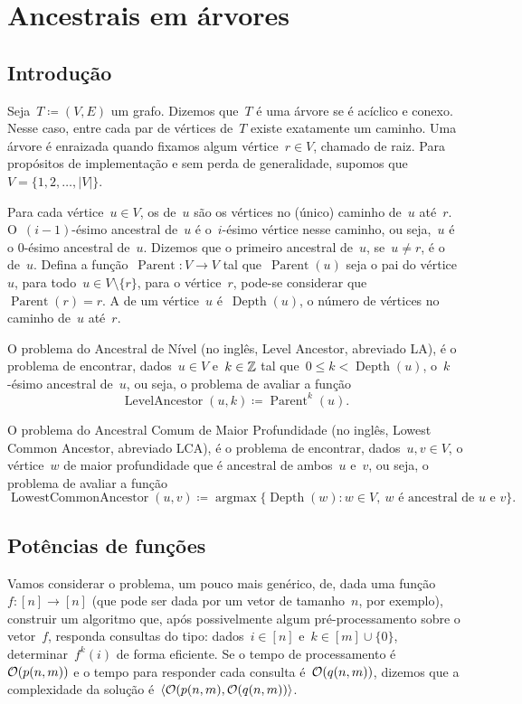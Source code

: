 \documentclass[main.tex]{subfiles}
\newcommand{\Par}{\operatorname{Parent}}
\newcommand{\LA}{\operatorname{LevelAncestor}}
\newcommand{\Dep}{\operatorname{Depth}}
\newcommand{\LCA}{\operatorname{LowestCommonAncestor}}
\newcommand{\argmax}{\operatorname{argmax}}
\begin{document}
\chapter{Ancestrais em árvores} \label{cap:ancestrais}

\section{Introdução}

Seja~$T \coloneqq (V, E)$ um grafo. Dizemos que~$T$ é uma árvore se é acíclico e conexo. Nesse caso, entre cada par de vértices de~$T$ existe exatamente um caminho. Uma árvore é enraizada quando fixamos algum vértice~${r \in V}$, chamado de raiz. Para propósitos de implementação e sem perda de generalidade, supomos que~$V = \{1, 2, \ldots, |V|\}$.


Para cada vértice~${u \in V}$, os  de~$u$ são os vértices no (único) caminho de~$u$ até~$r$. O~$(i-1)$-ésimo ancestral de~$u$ é o~$i$-ésimo vértice nesse caminho, ou seja,~$u$ é o $0$-ésimo ancestral de~$u$. Dizemos que o primeiro ancestral de~$u$, se~$u \neq r$, é o  de~$u$. Defina a função~${\Par: V \rightarrow V}$ tal que~$\Par(u)$ seja o pai do vértice~$u$, para todo~$u \in V \setminus \{r\}$, para o vértice~$r$, pode-se considerar que~$\Par(r) = r$. A  de um vértice~$u$ é~$\Dep(u)$, o número de vértices no caminho de~$u$ até~$r$.

O problema do Ancestral de Nível (no inglês, Level Ancestor, abreviado LA), é o problema de encontrar, dados~$u \in V$ e~$k \in \mathbb{Z}$ tal que~$0 \leq k < \Dep(u)$, o~$k$-ésimo ancestral de~$u$, ou seja, o problema de avaliar a função
$$\LA(u, k) \coloneqq \Par^k(u). $$

O problema do Ancestral Comum de Maior Profundidade (no inglês, Lowest Common Ancestor, abreviado LCA), é o problema de encontrar, dados~$u, v \in V$, o vértice~$w$ de maior profundidade que é ancestral de ambos~$u$ e~$v$, ou seja, o problema de avaliar a função
$$\LCA(u, v) \coloneqq \argmax\{\Dep(w) : w \in V,\ w \text{ é ancestral de $u$ e $v$}\}. $$

\section{Potências de funções} \label{sec:potfunc}

Vamos considerar o problema, um pouco mais genérico, de, dada uma função~$f : [n] \rightarrow [n]$ (que pode ser dada por um vetor de tamanho~$n$, por exemplo), construir um algoritmo que, após possivelmente algum pré-processamento sobre o vetor~$f$, responda consultas do tipo: dados~$i \in [n]$ e~$k \in [m] \cup \{0\}$, determinar~$f^k(i)$ de forma eficiente. Se o tempo de processamento é~$\mathcal{O}(p(n, m))$ e o tempo para responder cada consulta é~$\mathcal{O}(q(n, m))$, dizemos que a complexidade da solução é~$\langle\mathcal{O}(p(n, m), \mathcal{O}(q(n, m))\rangle$.
\end{document}
